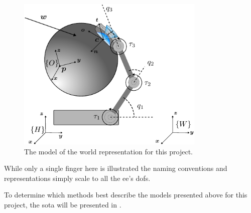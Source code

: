 
\begin{figure}[h]
	\begin{small}
		\begin{center}
			\includegraphics[width=0.8\textwidth]{chapters/modeling/fig/test-hand-kinematics-crop.pdf}
		\end{center}
		\caption{The model of the world representation for this project.}
		\label{fig:full-system-model}
	\end{small}
\end{figure}


While only a single finger here is illustrated the naming conventions and representations simply scale to all the \gls{ee}'s \gls{dof}s.\medskip

To determine which methods best describe the models presented above for this project, the \gls{sota} will be presented in .

